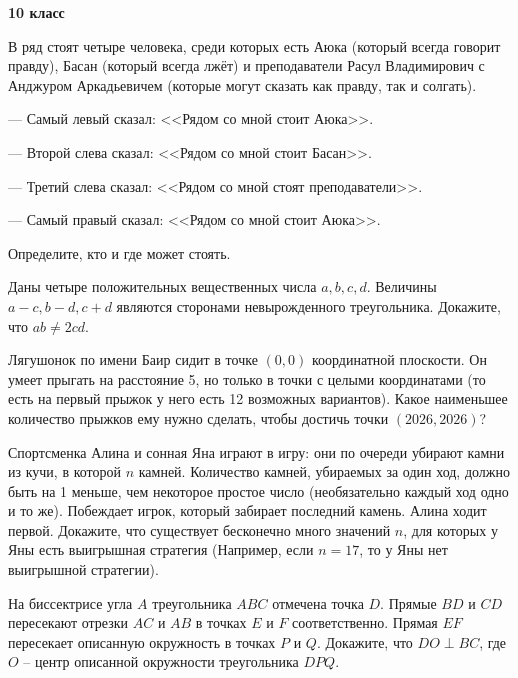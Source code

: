 \hspace{3mm}

\centerline{\bf \huge 10 класс}

\begin{flushright}
        \scriptsize{}
\end{flushright}

В ряд стоят четыре человека, среди которых есть Аюка (который всегда говорит правду), Басан (который всегда лжёт) и преподаватели Расул Владимирович с Анджуром Аркадьевичем (которые могут сказать как правду, так и солгать).

--- Самый левый сказал: <<Рядом со мной стоит Аюка>>.

--- Второй слева сказал: <<Рядом со мной стоит Басан>>.

--- Третий слева сказал: <<Рядом со мной стоят преподаватели>>.

--- Самый правый сказал: <<Рядом со мной стоит Аюка>>.

Определите, кто и где может стоять.


Даны четыре положительных вещественных числа $a, b, c, d$. Величины $a-c, b-d, c+d$ являются сторонами невырожденного треугольника. Докажите, что $a b \neq 2 c d$.


Лягушонок по имени Баир сидит в точке $(0,0)$ координатной плоскости. Он умеет прыгать на расстояние 5, но только в точки с целыми координатами (то есть на первый прыжок у него есть 12 возможных вариантов). Какое наименьшее количество прыжков ему нужно сделать, чтобы достичь точки $(2026, 2026)$?

Спортсменка Алина и сонная Яна играют в игру: они по очереди убирают камни из кучи, в которой $n$ камней. Количество камней, убираемых за один ход, должно быть на 1 меньше, чем некоторое простое число (необязательно каждый ход одно и то же). Побеждает игрок, который забирает последний камень. Алина ходит первой. Докажите, что существует бесконечно много значений $n$, для которых у Яны есть выигрышная стратегия (Например, если $n=17$, то у Яны нет выигрышной стратегии).

На биссектрисе угла $A$ треугольника $ABC$ отмечена точка $D$. Прямые $BD$ и $CD$ пересекают отрезки $AC$ и $AB$ в точках $E$ и $F$ соответственно. Прямая $EF$ пересекает описанную окружность в точках $P$ и $Q$. Докажите, что $DO \perp BC$, где $O$ – центр описанной окружности треугольника $DPQ$.   